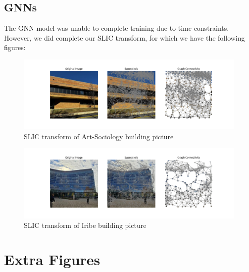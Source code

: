\documentclass{article}
\begin{document}
\subsection{GNNs}

The GNN model was unable to complete training due to time constraints. However, we did complete our SLIC transform, for which we have the following figures:

\begin{figure}[H]
    \centering
    \includegraphics[width=0.8\linewidth]{slic_1.png}
    \caption{SLIC transform of Art-Sociology building picture}
    \label{fig:slic1}
\end{figure}

\begin{figure}[H]
    \centering
    \includegraphics[width=0.8\linewidth]{slic_2.png}
    \caption{SLIC transform of Iribe building picture}
    \label{fig:slic2}
\end{figure}

\section{Extra Figures}
\label{extra_figures}
\end{document}
